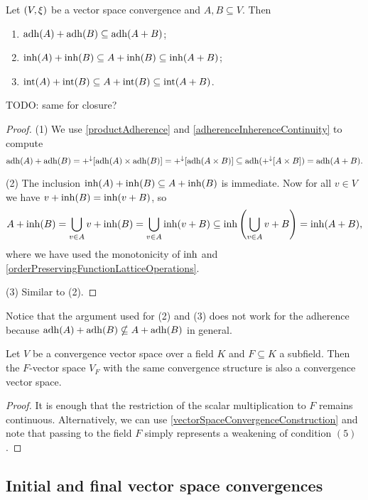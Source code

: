 \begin{proposition} \label{vectorSumInherenceAdherence}
Let $\left( V,\xi \right)$ be a vector space convergence and $A,B\subseteq V$. Then
\begin{enumerate}
\item $\operatorname{adh}(A)+\operatorname{adh}(B) \subseteq \operatorname{adh}(A+B)$;
\item $\operatorname{inh}(A)+\operatorname{inh}(B) \subseteq A+\operatorname{inh}(B) \subseteq \operatorname{inh}(A+B)$;
\item $\operatorname{int}(A)+\operatorname{int}(B) \subseteq A+\operatorname{int}(B) \subseteq \operatorname{int}(A+B)$.
\end{enumerate}
\end{proposition}
TODO: same for closure?
\begin{proof}
(1) We use \ref{productAdherence} and \ref{adherenceInherenceContinuity} to compute
\[ \operatorname{adh}(A)+\operatorname{adh}(B) = +^\downarrow[\operatorname{adh}(A)\times\operatorname{adh}(B)] = +^\downarrow[\operatorname{adh}(A\times B)] \subseteq \operatorname{adh}(+^\downarrow[A\times B]) = \operatorname{adh}(A+B). \]

(2) The inclusion $\operatorname{inh}(A)+\operatorname{inh}(B) \subseteq A+\operatorname{inh}(B)$ is immediate. Now for all $v\in V$ we have $v+\operatorname{inh}(B) = \operatorname{inh}(v+B)$, so
\[ A+\operatorname{inh}(B) = \bigcup_{v\in A}v+\operatorname{inh}(B) = \bigcup_{v\in A}\operatorname{inh}(v+B) \subseteq \operatorname{inh}\left(\bigcup_{v\in A} v+B\right) = \operatorname{inh}(A+B), \]
where we have used the monotonicity of $\operatorname{inh}$ and \ref{orderPreservingFunctionLatticeOperations}.

(3) Similar to (2).
\end{proof}
Notice that the argument used for (2) and (3) does not work for the adherence because $\operatorname{adh}(A)+\operatorname{adh}(B) \nsubseteq A+\operatorname{adh}(B)$ in general.

\begin{lemma}
Let $V$ be a convergence vector space over a field $K$ and $F\subseteq K$ a subfield. Then the $F$-vector space $V_F$ with the same convergence structure is also a convergence vector space.
\end{lemma}
\begin{proof}
It is enough that the restriction of the scalar multiplication to $F$ remains continuous. Alternatively, we can use \ref{vectorSpaceConvergenceConstruction} and note that passing to the field $F$ simply represents a weakening of condition $(5)$.
\end{proof}


\subsection{Initial and final vector space convergences}
